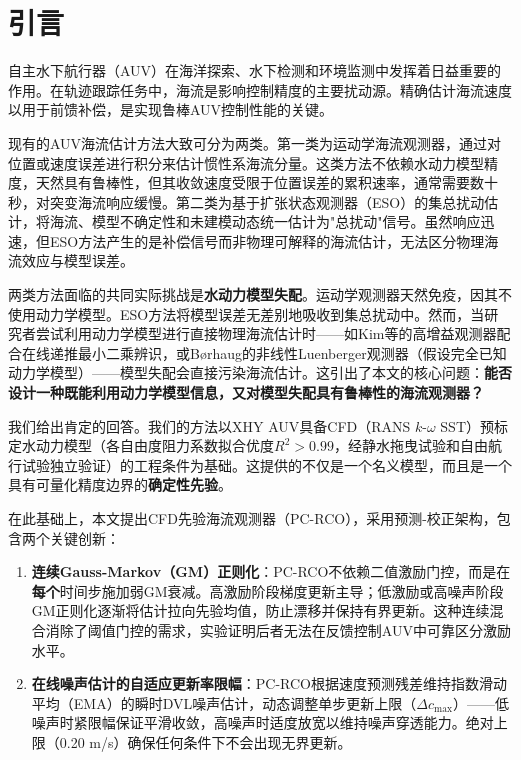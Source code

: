 \section{引言}

自主水下航行器（AUV）在海洋探索、水下检测和环境监测中发挥着日益重要的作用\cite{fossen2011handbook}。在轨迹跟踪任务中，海流是影响控制精度的主要扰动源。精确估计海流速度以用于前馈补偿，是实现鲁棒AUV控制性能的关键\cite{borhaug2007model}。

现有的AUV海流估计方法大致可分为两类。第一类为运动学海流观测器\cite{liang2018three,he2024three}，通过对位置或速度误差进行积分来估计惯性系海流分量。这类方法不依赖水动力模型精度，天然具有鲁棒性，但其收敛速度受限于位置误差的累积速率，通常需要数十秒，对突变海流响应缓慢。第二类为基于扩张状态观测器（ESO）的集总扰动估计\cite{xie2020extended}，将海流、模型不确定性和未建模动态统一估计为"总扰动"信号。虽然响应迅速，但ESO方法产生的是补偿信号而非物理可解释的海流估计，无法区分物理海流效应与模型误差。

两类方法面临的共同实际挑战是\textbf{水动力模型失配}。运动学观测器天然免疫，因其不使用动力学模型。ESO方法将模型误差无差别地吸收到集总扰动中。然而，当研究者尝试利用动力学模型进行直接物理海流估计时——如Kim等的高增益观测器配合在线递推最小二乘辨识\cite{kim2018estimating}，或Børhaug的非线性Luenberger观测器\cite{borhaug2007model}（假设完全已知动力学模型）——模型失配会直接污染海流估计。这引出了本文的核心问题：\textbf{能否设计一种既能利用动力学模型信息，又对模型失配具有鲁棒性的海流观测器？}

我们给出肯定的回答。我们的方法以XHY AUV具备CFD（RANS $k$-$\omega$ SST）预标定水动力模型（各自由度阻力系数拟合优度$R^2>0.99$，经静水拖曳试验和自由航行试验独立验证）的工程条件为基础。这提供的不仅是一个名义模型，而且是一个具有可量化精度边界的\textbf{确定性先验}。

在此基础上，本文提出CFD先验海流观测器（PC-RCO），采用预测-校正架构，包含两个关键创新：

\begin{enumerate}[itemsep=0pt,topsep=4pt]
    \item \textbf{连续Gauss-Markov（GM）正则化}：PC-RCO不依赖二值激励门控，而是在\textbf{每个}时间步施加弱GM衰减。高激励阶段梯度更新主导；低激励或高噪声阶段GM正则化逐渐将估计拉向先验均值，防止漂移并保持有界更新。这种连续混合消除了阈值门控的需求，实验证明后者无法在反馈控制AUV中可靠区分激励水平。
    \item \textbf{在线噪声估计的自适应更新率限幅}：PC-RCO根据速度预测残差维持指数滑动平均（EMA）的瞬时DVL噪声估计，动态调整单步更新上限（$\Delta c_{\max}$）——低噪声时紧限幅保证平滑收敛，高噪声时适度放宽以维持噪声穿透能力。绝对上限（0.20 m/s）确保任何条件下不会出现无界更新。
\end{enumerate}

